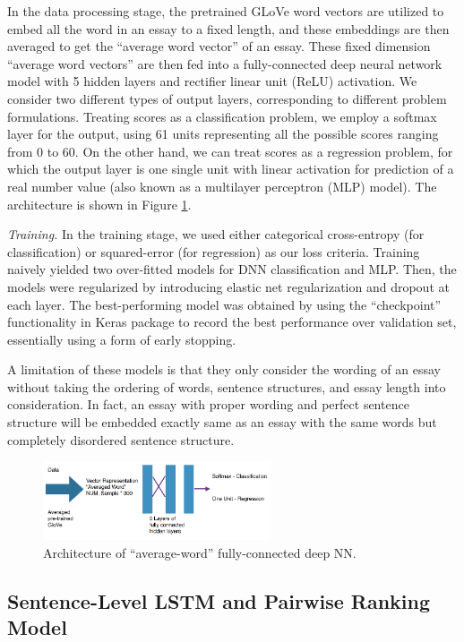 \documentclass[10pt,psamsfonts]{amsart}
\theoremstyle{definition}
\theoremstyle{remark}
\numberwithin{equation}{section}
\begin{document}
In the data processing stage, the pretrained GLoVe word vectors are utilized to embed all the word in an essay to a fixed length, and these embeddings are then averaged to get the ``average word vector'' of an essay. These fixed dimension ``average word vectors'' are then fed into a fully-connected deep neural network model with 5 hidden layers and rectifier linear unit (ReLU) activation. We consider two different types of output layers, corresponding to different problem formulations. Treating scores as a classification problem, we employ a softmax layer for the output, using 61 units representing all the possible scores ranging from 0 to 60. On the other hand, we can treat scores as a regression problem, for which the output layer is one single unit with linear activation for prediction of a real number value (also known as a multilayer perceptron (MLP) model). The architecture is shown in Figure \ref{fig:dnn}.

{\em Training.} In the training stage, we used either categorical cross-entropy (for classification) or squared-error (for regression) as our loss criteria. Training naively yielded two over-fitted models for DNN classification and MLP. Then, the models were regularized by introducing elastic net regularization and dropout at each layer. The best-performing model was obtained by using the ``checkpoint'' functionality in Keras package to record the best performance over validation set, essentially using a form of early stopping.

A limitation of these models is that they only consider the wording of an essay without taking the ordering of words, sentence structures, and essay length into consideration. In fact, an essay with proper wording and perfect sentence structure will be embedded exactly same as an essay with the same words but completely disordered sentence structure. 

\begin{figure}
	\includegraphics[width=0.6\textwidth]{dnn.png}
	\caption{Architecture of ``average-word'' fully-connected deep NN.}
	\label{fig:dnn}
\end{figure}

\subsection*{Sentence-Level LSTM and Pairwise Ranking Model}\hfill\\
\vskip -0.1in
\end{document}
